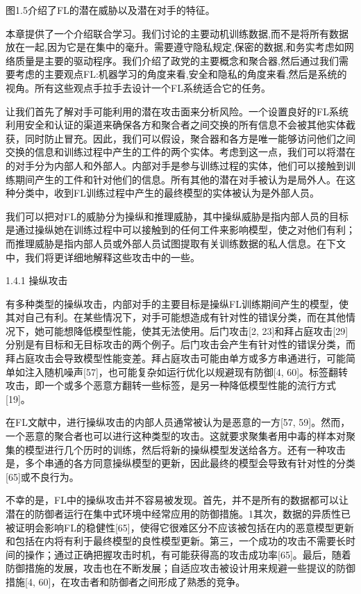 图1.5介绍了FL的潜在威胁以及潜在对手的特征。

本章提供了一个介绍联合学习。我们讨论的主要动机训练数据,而不是将所有数据放在一起,因为它是在集中的毫升。需要遵守隐私规定,保密的数据,和务实考虑如网络质量是主要的驱动程序。我们介绍了政党的主要概念和聚合器,然后通过我们需要考虑的主要观点FL:机器学习的角度来看,安全和隐私的角度来看,然后是系统的视角。所有这些观点手拉手去设计一个FL系统适合它的任务。

让我们首先了解对手可能利用的潜在攻击面来分析风险。一个设置良好的FL系统利用安全和认证的渠道来确保各方和聚合者之间交换的所有信息不会被其他实体截获，同时防止冒充。因此，我们可以假设，聚合器和各方是唯一能够访问他们之间交换的信息和训练过程中产生的工件的两个实体。考虑到这一点，我们可以将潜在的对手分为内部人和外部人。内部对手是参与训练过程的实体，他们可以接触到训练期间产生的工件和针对他们的信息。所有其他的潜在对手被认为是局外人。在这种分类中，收到FL训练过程中产生的最终模型的实体被认为是外部人员。

我们可以把对FL的威胁分为操纵和推理威胁，其中操纵威胁是指内部人员的目标是通过操纵她在训练过程中可以接触到的任何工件来影响模型，使之对他们有利；而推理威胁是指内部人员或外部人员试图提取有关训练数据的私人信息。在下文中，我们将更详细地解释这些攻击中的一些。

1.4.1 操纵攻击

有多种类型的操纵攻击，内部对手的主要目标是操纵FL训练期间产生的模型，使其对自己有利。在某些情况下，对手可能想造成有针对性的错误分类，而在其他情况下，她可能想降低模型性能，使其无法使用。后门攻击[2, 23]和拜占庭攻击[29]分别是有目标和无目标攻击的两个例子。后门攻击会产生有针对性的错误分类，而拜占庭攻击会导致模型性能变差。拜占庭攻击可能由单方或多方串通进行，可能简单如注入随机噪声[57]，也可能复杂如运行优化以规避现有防御[4, 60]。标签翻转攻击，即一个或多个恶意方翻转一些标签，是另一种降低模型性能的流行方式[19]。

在FL文献中，进行操纵攻击的内部人员通常被认为是恶意的一方[57, 59]。然而，一个恶意的聚合者也可以进行这种类型的攻击。这就要求聚集者用中毒的样本对聚集的模型进行几个历时的训练，然后将新的操纵模型发送给各方。还有一种攻击是，多个串通的各方同意操纵模型的更新，因此最终的模型会导致有针对性的分类[65]或不良行为。

不幸的是，FL中的操纵攻击并不容易被发现。首先，并不是所有的数据都可以让潜在的防御者运行在集中式环境中经常应用的防御措施。1其次，数据的异质性已被证明会影响FL的稳健性[65]，使得它很难区分不应该被包括在内的恶意模型更新和包括在内将有利于最终模型的良性模型更新。第三，一个成功的攻击不需要长时间的操作；通过正确把握攻击时机，有可能获得高的攻击成功率[65]。最后，随着防御措施的发展，攻击也在不断发展；自适应攻击被设计用来规避一些提议的防御措施[4, 60]，在攻击者和防御者之间形成了熟悉的竞争。

